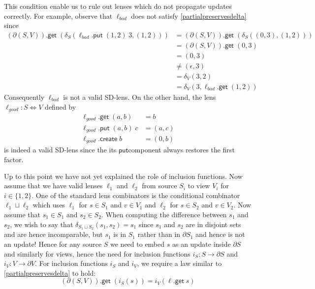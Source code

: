 \documentclass[acmsmall,review,anonymous]{acmart}\settopmatter{printfolios=true,printccs=false,printacmref=false}
\newcommand{\kw}[1]{\ensuremath{\mathsf{#1}}}
\newcommand{\get}{\ensuremath{\kw{get}}}
\newcommand{\pput}{\ensuremath{\kw{put}}}
\newcommand{\create}{\ensuremath{\kw{create}}}
\begin{document}
This condition enable us to rule out lenses which do not propagate updates
correctly. For example, observe that $\ell_{bad}$ does not satisfy
\cref{partialpreservesdelta} since
\begin{align*}
(\partial (S, V)).\get \; (\delta_S(\ell_{bad}.\pput \; (1,2) \; 3, (1,2))) &=
(\partial (S, V)).\get \; (\delta_S((0,3), (1,2)))\\
&= (\partial (S, V)).\get \; (0,3)\\
&= (0,3)\\
&\neq (\epsilon, 3)\\
&= \delta_V(3, 2)\\
&= \delta_V(3, \ell_{bad}.\get \; (1, 2))
\end{align*}
Consequently $\ell_{bad}$ is not a valid SD-lens. On the
other hand, the lens $\ell_{good} : S \Leftrightarrow V$ defined by
\begin{align*}
\ell_{good}.\get \; (a, b) &= b\\
\ell_{good}.\pput \; (a, b) \; c &= (a, c)\\
\ell_{good}.\create \; b &= (0, b)
\end{align*}
is indeed a valid SD-lens since the its \pput component always restores the
first factor.

Up to this point we have not yet explained the role of inclusion functions. Now
assume that we have valid lenses $\ell_1$ and $\ell_2$ from source $S_i$ to
view $V_i$ for $i \in  \{1, 2\}$. One of the standard lens combinators is the
conditional combinator $\ell_1 \sqcup \ell_2$ which uses $\ell_1$ for $s \in
S_1$ and $v \in V_1$ and $\ell_2$ for $s \in S_2$ and $v \in V_2$. Now assume
that $s_1 \in S_1$ and $s_2 \in S_2$. When computing the difference between
$s_1$ and $s_2$, we wish to say that $\delta_{S_1 \sqcup S_2}(s_1, s_2) = s_1$
since $s_1$ and $s_2$ are in disjoint sets and are hence incomparable, but $s_1$
is in $S_1$ rather than in $\partial S_1$ and hence is not an update! Hence for
any source $S$ we need to embed $s$ as an update inside $\partial S$ and
similarly for views, hence the need for inclusion functions $i_S : S
\longrightarrow \partial S$ and $i_V : V \longrightarrow \partial V$. For
inclusion functions $i_S$ and $i_V$, we require a law similar to
\cref{partialpreservesdelta} to hold: $$(\partial (S, V)).\get \; (i_{S}(s)) =
i_{V}(\ell.\get \; s)$$
\end{document}
